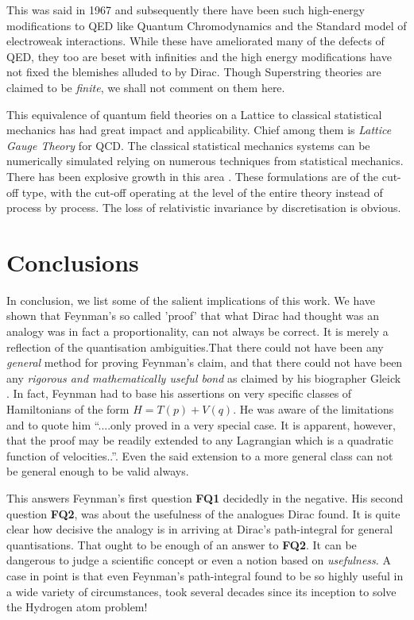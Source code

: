 \documentclass[12pt]{article}
\begin{document}
This was said in 1967 and subsequently there have been such high-energy modifications to QED like Quantum Chromodynamics and the Standard
model of electroweak interactions. While these have ameliorated many of the defects of QED, they too are beset with infinities and the
high energy modifications have not fixed the blemishes alluded to by Dirac. Though Superstring theories are claimed to be {\it finite}, we
shall not comment on them here.

This equivalence of quantum field theories on a Lattice to classical statistical mechanics has had great impact and applicability. Chief 
among them is
{\it Lattice Gauge Theory} \cite{seiler} for QCD. The classical statistical mechanics systems can be numerically simulated relying on numerous techniques
from statistical mechanics. There has been explosive growth in this area \cite{creutz}. These formulations are of the cut-off type, with
the cut-off operating at the level of the entire theory instead of process by process. The loss of relativistic invariance by discretisation
is obvious.
\section{Conclusions}
In conclusion, we list some of the salient implications of this work.  We have shown that Feynman's  so called 'proof' that what Dirac had
thought was an analogy was in fact a proportionality, can not always be correct. It is merely a reflection of the quantisation ambiguities.That 
there could not have been any {\it general} method for proving Feynman's claim, and that there could not have been any {\it rigorous 
and mathematically useful bond} as claimed by his biographer Gleick \cite{gleick}.
In fact, Feynman had to base his assertions on very specific classes of Hamiltonians of the form $H = T(p) + V(q)$. He was aware of the
limitations and to quote him ``....only proved in a very special case. It is apparent, however, that the proof may be readily extended to
any Lagrangian which is a quadratic function of velocities..''. Even the said extension to a more general class can not be general enough to
be valid always.

This answers Feynman's first question {\bf FQ1} decidedly in the negative. His second question {\bf FQ2}, was about the usefulness
of the analogues Dirac found. It is quite clear how decisive the analogy is in arriving at Dirac's path-integral for general quantisations.
That ought to be enough of an answer to {\bf FQ2}. It can be dangerous to judge a scientific concept or even a notion
based on {\it usefulness}. A case in point is that even Feynman's path-integral found to be so highly useful in a wide variety of circumstances,
took several decades since its inception to solve the Hydrogen atom problem! 
\end{document}
